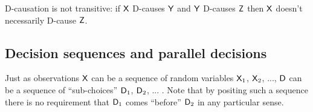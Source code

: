 D-causation is not transitive: if $\mathsf{X}$ D-causes $\mathsf{Y}$ and $\mathsf{Y}$ D-causes $\mathsf{Z}$ then $\mathsf{X}$ doesn't necessarily D-cause $\mathsf{Z}$.



\subsection{Decision sequences and parallel decisions}

Just as observations $\mathsf{X}$ can be a sequence of random variables $\mathsf{X}_1$, $\mathsf{X}_2$, ..., $\mathsf{D}$ can be a sequence of ``sub-choices'' $\mathsf{D}_1$, $\mathsf{D}_2$, ... . Note that by positing such a sequence there is no requirement that $\mathsf{D}_1$ comes ``before'' $\mathsf{D}_2$ in any particular sense.

